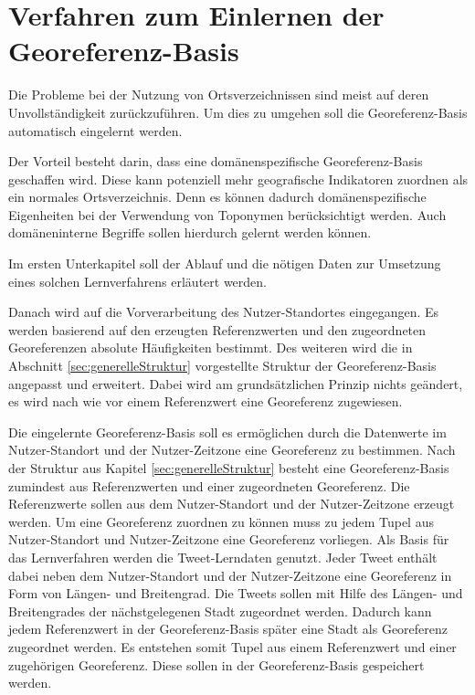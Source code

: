 	\section{Verfahren zum Einlernen der Georeferenz-Basis}

		Die Probleme bei der Nutzung von Ortsverzeichnissen sind meist auf deren Unvollständigkeit zurückzuführen. 
		Um dies zu umgehen soll die Georeferenz-Basis automatisch eingelernt werden. 

		Der Vorteil besteht darin, dass eine domänenspezifische Georeferenz-Basis geschaffen wird.
		Diese kann potenziell mehr geografische Indikatoren zuordnen als ein normales Ortsverzeichnis.
		Denn es können dadurch domänenspezifische Eigenheiten bei der Verwendung von Toponymen berücksichtigt werden. 
		Auch domäneninterne Begriffe sollen hierdurch gelernt werden können.

		Im ersten Unterkapitel soll der Ablauf und die nötigen Daten zur Umsetzung eines solchen Lernverfahrens erläutert werden.

		Danach wird auf die Vorverarbeitung des Nutzer-Standortes eingegangen.
		Es werden basierend auf den erzeugten Referenzwerten und den zugeordneten Georeferenzen absolute Häufigkeiten bestimmt.
		Des weiteren wird die in Abschnitt \ref{sec:generelleStruktur} vorgestellte Struktur der Georeferenz-Basis angepasst und erweitert.
		Dabei wird am grundsätzlichen Prinzip nichts geändert, es wird nach wie vor einem Referenzwert eine Georeferenz zugewiesen. 

		Die eingelernte Georeferenz-Basis soll es ermöglichen durch die Datenwerte im Nutzer-Standort und der Nutzer-Zeitzone eine Georeferenz zu bestimmen.
		Nach der Struktur aus Kapitel \ref{sec:generelleStruktur} besteht eine Georeferenz-Basis zumindest aus Referenzwerten und einer zugeordneten Georeferenz.
		Die Referenzwerte sollen aus dem Nutzer-Standort und der Nutzer-Zeitzone erzeugt werden.
		Um eine Georeferenz zuordnen zu können muss zu jedem Tupel aus Nutzer-Standort und Nutzer-Zeitzone eine Georeferenz vorliegen.
		Als Basis für das Lernverfahren werden die Tweet-Lerndaten genutzt.
		Jeder Tweet enthält dabei neben dem Nutzer-Standort und der Nutzer-Zeitzone eine Georeferenz in Form von Längen- und Breitengrad. 
		Die Tweets sollen mit Hilfe des Längen- und Breitengrades der nächstgelegenen Stadt zugeordnet werden. 
		Dadurch kann jedem Referenzwert in der Georeferenz-Basis später eine Stadt als Georeferenz zugeordnet werden.
		Es entstehen somit Tupel aus einem Referenzwert und einer zugehörigen Georeferenz.
		Diese sollen in der Georeferenz-Basis gespeichert werden.

